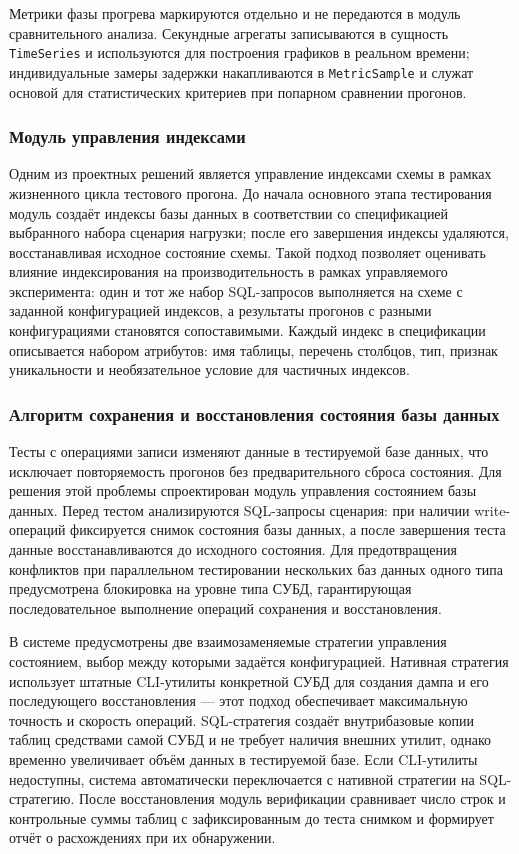 Метрики фазы прогрева маркируются отдельно и не передаются в модуль сравнительного анализа. Секундные агрегаты записываются в сущность \texttt{TimeSeries} и используются для построения графиков в реальном времени; индивидуальные замеры задержки накапливаются в \texttt{MetricSample} и служат основой для статистических критериев при попарном сравнении прогонов.

\subsubsection{Модуль управления индексами}

Одним из проектных решений является управление индексами схемы в рамках жизненного цикла тестового прогона. До начала основного этапа тестирования модуль создаёт индексы базы данных в соответствии со спецификацией выбранного набора сценария нагрузки; после его завершения индексы удаляются, восстанавливая исходное состояние схемы. Такой подход позволяет оценивать влияние индексирования на производительность в рамках управляемого эксперимента: один и тот же набор SQL-запросов выполняется на схеме с заданной конфигурацией индексов, а результаты прогонов с разными конфигурациями становятся сопоставимыми. Каждый индекс в спецификации описывается набором атрибутов: имя таблицы, перечень столбцов, тип, признак уникальности и необязательное условие для частичных индексов.

\subsubsection{Алгоритм сохранения и восстановления состояния базы данных}

Тесты с операциями записи изменяют данные в тестируемой базе данных, что исключает повторяемость прогонов без предварительного сброса состояния. Для решения этой проблемы спроектирован модуль управления состоянием базы данных. Перед тестом анализируются SQL-запросы сценария: при наличии write-операций фиксируется снимок состояния базы данных, а после завершения теста данные восстанавливаются до исходного состояния. Для предотвращения конфликтов при параллельном тестировании нескольких баз данных одного типа предусмотрена блокировка на уровне типа СУБД, гарантирующая последовательное выполнение операций сохранения и восстановления.

В системе предусмотрены две взаимозаменяемые стратегии управления состоянием, выбор между которыми задаётся конфигурацией. Нативная стратегия использует штатные CLI-утилиты конкретной СУБД для создания дампа и его последующего восстановления --- этот подход обеспечивает максимальную точность и скорость операций. SQL-стратегия создаёт внутрибазовые копии таблиц средствами самой СУБД и не требует наличия внешних утилит, однако временно увеличивает объём данных в тестируемой базе. Если CLI-утилиты недоступны, система автоматически переключается с нативной стратегии на SQL-стратегию. После восстановления модуль верификации сравнивает число строк и контрольные суммы таблиц с зафиксированным до теста снимком и формирует отчёт о расхождениях при их обнаружении.

